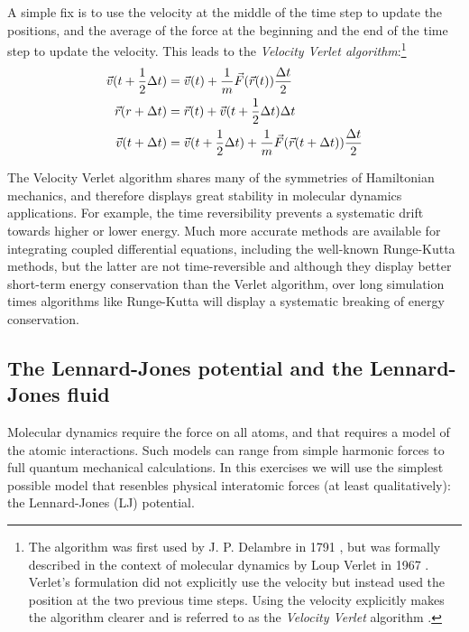 \documentclass[a4paper,11pt]{article}
\begin{document}
A simple fix is to use the velocity at the middle of the time step to
update the positions, and the average of the force at the beginning
and the end of the time step to update the velocity.  This leads to
the \emph{Velocity Verlet algorithm}:\footnote{The algorithm was first
  used by J. P. Delambre in 1791 \cite{WikiVerlet}, but was formally described in the
  context of molecular dynamics by Loup Verlet in 1967 \cite{Verlet1967}.
  Verlet's formulation did not explicitly use the velocity but instead
  used the position at the two previous time steps.  Using the
  velocity explicitly makes the algorithm clearer and is referred to
  as the \emph{Velocity Verlet} algorithm \cite{dfrenkel2002:mc}.}
\begin{align}
  \label{eq:Verlet}
  \vec v(t + \frac12 \Delta t) &= \vec v(t) + {1 \over m} \vec F(\vec r(t))
                         {\Delta t \over 2}\\
  \vec r(r + \Delta t) &= \vec r(t) + \vec v(t + \frac12 \Delta t)
                         \Delta t\\
  \vec v(t + \Delta t) &= \vec v(t + \frac12 \Delta t) + {1 \over m}
                         \vec F(\vec r(t + \Delta t))
                         {\Delta t \over 2}
\end{align}

The Velocity Verlet algorithm shares many of the symmetries of
Hamiltonian mechanics, and therefore displays great stability in
molecular dynamics applications.  For example, the time reversibility
prevents a systematic drift towards higher or lower energy.  Much more
accurate methods are available for integrating coupled differential
equations, including the well-known Runge-Kutta methods, but the
latter are not time-reversible and although they display better
short-term energy conservation than the Verlet algorithm, over long
simulation times algorithms like Runge-Kutta will display a systematic
breaking of energy conservation.


\subsection{The Lennard-Jones potential and the Lennard-Jones fluid}

Molecular dynamics require the force on all atoms, and that requires a
model of the atomic interactions.  Such models can range from simple
harmonic forces to full quantum mechanical calculations.  In this
exercises we will use the simplest possible model that resenbles
physical interatomic forces (at least qualitatively): the
Lennard-Jones (LJ) potential.
\end{document}
